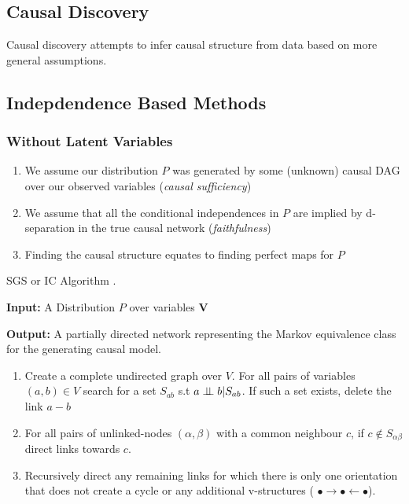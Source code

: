 \documentclass[b0,landscape,25pt]{sciposter}
\begin{document}
\begin{multicols}{5}
\columnbreak
\section*{Causal Discovery}

Causal discovery attempts to infer causal structure from data based on more general assumptions. 

\subsection*{Indepdendence Based Methods}
\subsubsection*{Without Latent Variables}
\begin{enumerate}
\item We assume our distribution $P$ was generated by some (unknown) causal DAG over our observed variables (\emph{causal sufficiency}) 
\item We assume that all the conditional independences in $P$ are implied by d-separation in the true causal network (\emph{faithfulness}) 
\item Finding the causal structure equates to finding perfect maps for $P$
\end{enumerate}

\begin{algorithm}
\caption{SGS or IC Algorithm \cite{Sprites,Pearl2000}. \label{alg:spect}}
\textbf{Input:} A Distribution $P$ over variables $\boldsymbol{V}$

\textbf{Output:} A partially directed network representing the Markov equivalence class for the generating causal model.
\begin{enumerate}
\item Create a complete undirected graph over $V$. For all pairs of variables $(a,b) \in V$ search for a set $S_{ab}$ s.t $a \perp\!\!\!\perp b|S_{ab}$. If such a set exists, delete the link $a-b$
\item For all pairs of unlinked-nodes $(\alpha, \beta)$ with a common neighbour $c$, if $c \notin S_{\alpha \beta}$ direct links towards $c$.
\item Recursively direct any remaining links for which there is only one orientation that does not create a cycle or any additional v-structures ( $\bullet \rightarrow \bullet \leftarrow \bullet$). 
\end{enumerate}
\end{algorithm}


\end{multicols}
\end{document}
